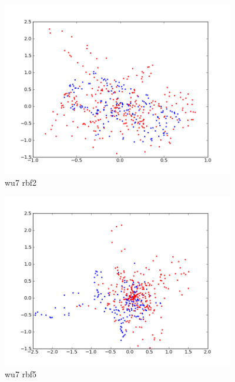 \begin{figure}[here]
	\center
	\caption{wu7 rbf2}
	\label{fig:wu7_rbf2}
	\includegraphics[width=4.0in]{img/wu7_rbf2.png}
\end{figure}

\begin{figure}[here]
	\center
	\caption{wu7 rbf5}
	\label{fig:wu7_rbf5}
	\includegraphics[width=4.0in]{img/wu7_rbf5.png}
\end{figure}